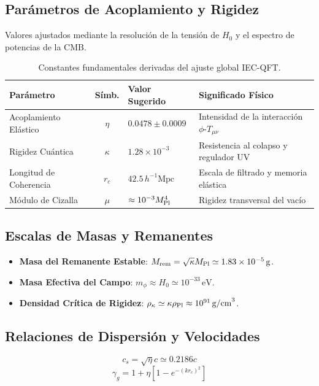 \documentclass[11pt,a4paper]{article}
\begin{document}
\subsection{Parámetros de Acoplamiento y Rigidez}
Valores ajustados mediante la resolución de la tensión de $H_0$ y el espectro de potencias de la CMB.

\begin{table}[h!]
	\centering
	\small
	\begin{tabular}{|l|c|p{3.5cm}|p{4.5cm}|}
		\hline
		\textbf{Parámetro} & \textbf{Símb.} & \textbf{Valor Sugerido} & \textbf{Significado Físico} \\ \hline
		Acoplamiento Elástico & $\eta$ & $0.0478 \pm 0.0009$ & Intensidad de la interacción $\phi$-$T_{\mu\nu}$ \\ \hline
		Rigidez Cuántica & $\kappa$ & $1.28 \times 10^{-3}$ & Resistencia al colapso y regulador UV \\ \hline
		Longitud de Coherencia & $r_c$ & $42.5 \, h^{-1} \text{Mpc}$ & Escala de filtrado y memoria elástica \\ \hline
		Módulo de Cizalla & $\mu$ & $\approx 10^{-3} M_{\rm Pl}^4$ & Rigidez transversal del vacío \\ \hline
	\end{tabular}
	\caption{Constantes fundamentales derivadas del ajuste global IEC-QFT.}
\end{table}

\subsection{Escalas de Masas y Remanentes}
\begin{itemize}
	\item \textbf{Masa del Remanente Estable}: $M_{\rm rem} = \sqrt{\kappa} M_{\rm Pl} \simeq 1.83 \times 10^{-5} \, \text{g}$.
	\item \textbf{Masa Efectiva del Campo}: $m_{\phi} \approx H_0 \simeq 10^{-33} \, \text{eV}$.
	\item \textbf{Densidad Crítica de Rigidez}: $\rho_{\kappa} \simeq \kappa \rho_{\rm Pl} \approx 10^{91} \, \text{g/cm}^3$.
\end{itemize}

\subsection{Relaciones de Dispersión y Velocidades}
\begin{equation}
	c_s = \sqrt{\eta} c \simeq 0.2186 c
\end{equation}
\begin{equation}
	\gamma_g = 1 + \eta \left[ 1 - e^{-(k r_c)^2} \right]
\end{equation}
\end{document}
